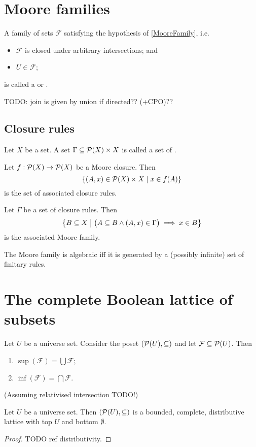 \section{Moore families}
\begin{definition}
A family of sets $\mathcal{F}$ satisfying the hypothesis of \ref{MooreFamily}, i.e.\
\begin{itemize}
\item $\mathcal{F}$ is closed under arbitrary intersections; and
\item $U \in \mathcal{F}$;
\end{itemize}
is called a  or .
\end{definition}

TODO: join is given by union if directed?? (+CPO)??

\subsection{Closure rules}
\begin{definition}
Let $X$ be a set. A set $\Gamma \subseteq \operatorname{\mathcal{P}}(X)\times X$ is called a set of .
\end{definition}

Let $f: \operatorname{\mathcal{P}}(X) \to \operatorname{\mathcal{P}}(X)$ be a Moore closure. Then
\[ \setbuilder{(A,x) \in \powerset(X)\times X}{x\in f(A)} \]
is the set of associated closure rules.

Let $\Gamma$ be a set of closure rules. Then
\[ \setbuilder{B\subseteq X}{\big(A\subseteq B \land (A,x)\in \Gamma\big) \implies x\in B} \]
is the associated Moore family.

The Moore family is algebraic iff it is generated by a (possibly infinite) set of finitary rules.

\section{The complete Boolean lattice of subsets}
\begin{lemma}
Let $U$ be a universe set. Consider the poset $\sSet{\powerset(U), \subseteq}$ and let $\mathcal{F}\subseteq \operatorname{\mathcal{P}}(U)$. Then
\begin{enumerate}
\item $\sup(\mathcal{F}) = \bigcup \mathcal{F}$;
\item $\inf(\mathcal{F}) = \bigcap \mathcal{F}$.
\end{enumerate}
(Assuming relativised intersection TODO!)
\end{lemma}
\begin{corollary}
Let $U$ be a universe set. Then $\sSet{\powerset(U), \subseteq}$ is a bounded, complete, distributive lattice with top $U$ and bottom $\emptyset$.
\end{corollary}
\begin{proof}
TODO ref distributivity.
\end{proof}

